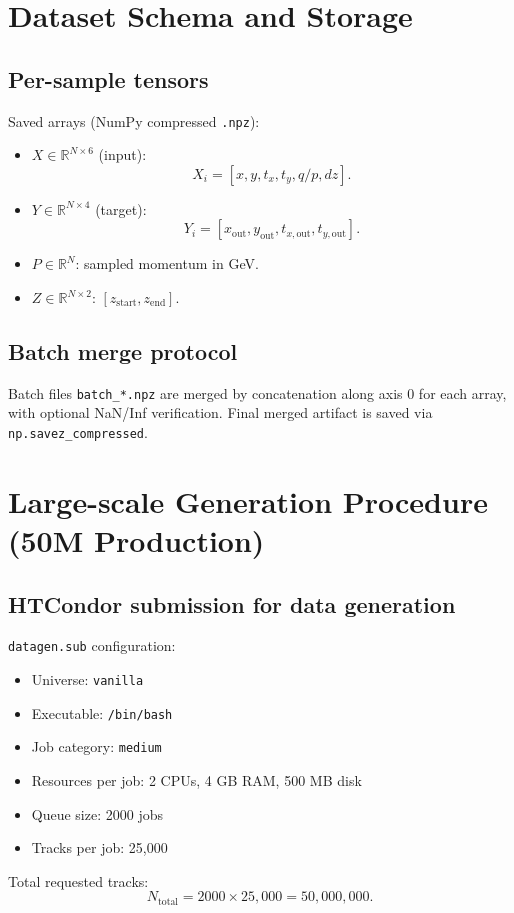 \documentclass[11pt,a4paper]{article}
\begin{document}
\section{Dataset Schema and Storage}
\subsection{Per-sample tensors}
Saved arrays (NumPy compressed \texttt{.npz}):
\begin{itemize}[leftmargin=*]
  \item $X\in\mathbb{R}^{N\times6}$ (input):
  \begin{equation*}
  X_i = [x, y, t_x, t_y, q/p, dz].
  \end{equation*}
  \item $Y\in\mathbb{R}^{N\times4}$ (target):
  \begin{equation*}
  Y_i = [x_{\mathrm{out}}, y_{\mathrm{out}}, t_{x,\mathrm{out}}, t_{y,\mathrm{out}}].
  \end{equation*}
  \item $P\in\mathbb{R}^{N}$: sampled momentum in GeV.
  \item $Z\in\mathbb{R}^{N\times2}$: $[z_{\mathrm{start}}, z_{\mathrm{end}}]$.
\end{itemize}

\subsection{Batch merge protocol}
Batch files \texttt{batch\_*.npz} are merged by concatenation along axis 0 for each array, with optional NaN/Inf verification. Final merged artifact is saved via \texttt{np.savez\_compressed}.

\section{Large-scale Generation Procedure (50M Production)}
\subsection{HTCondor submission for data generation}
\texttt{datagen.sub} configuration:
\begin{itemize}[leftmargin=*]
  \item Universe: \texttt{vanilla}
  \item Executable: \texttt{/bin/bash}
  \item Job category: \texttt{medium}
  \item Resources per job: 2 CPUs, 4 GB RAM, 500 MB disk
  \item Queue size: 2000 jobs
  \item Tracks per job: 25,000
\end{itemize}
Total requested tracks:
\begin{equation}
N_{\mathrm{total}} = 2000\times 25,000 = 50,000,000.
\end{equation}
\end{document}
